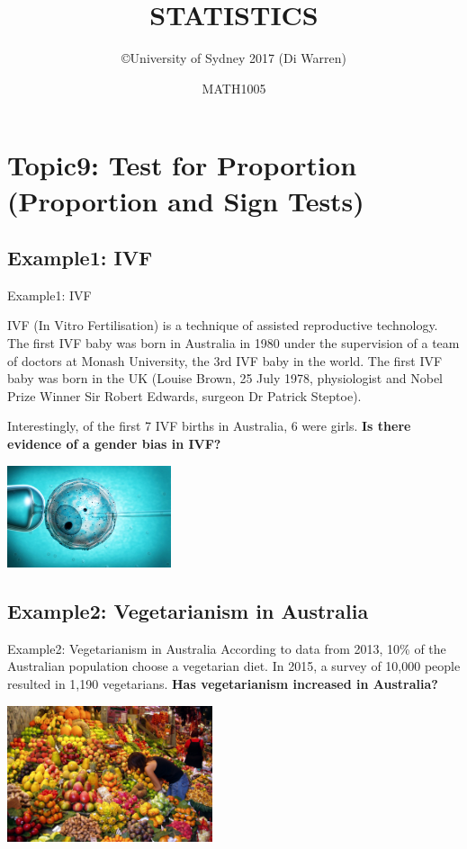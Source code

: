 \documentclass[t,xcolor=pdftex,dvipsnames,table]{beamer}
\title{\Huge STATISTICS}
\subtitle{}
\author{\copyright University of Sydney 2017 (Di Warren)}
\date{MATH1005}
\begin{document}
\section[9]{Topic9: Test for Proportion (Proportion and Sign Tests)}

\subsection[Example]{Example1: IVF}
\begin{frame}{Example1: IVF}

IVF (In Vitro Fertilisation) is a technique of assisted reproductive technology.
The first IVF baby was born in Australia in 1980 under the supervision of a team of doctors at Monash University, the 3rd IVF baby in the world. The first IVF baby was born in the UK (Louise Brown, 25 July 1978, physiologist and Nobel Prize Winner Sir Robert Edwards, surgeon Dr Patrick Steptoe).

\vspace{.5cm}
Interestingly, of the first 7 IVF births in Australia, 6 were girls. {\bf Is there evidence of a gender bias in IVF?}

\begin{center}
\includegraphics[height=3cm]{../images/IVF.jpg}
\end{center}
\end{frame}

\subsection[Example]{Example2: Vegetarianism in Australia}
\begin{frame}{Example2: Vegetarianism in Australia}
According to data from 2013, 10\% of the Australian population choose a vegetarian diet. In 2015, a survey of 10,000 people resulted in 1,190 vegetarians.
{\bf Has vegetarianism increased in Australia?}

\begin{center}
\includegraphics[height=4cm]{../images/BarcelonaFruit.jpg}
\end{center}
\href{http://www.roymorgan.com/findings/5264-meat-free-health-conscious-anxious-australias-vegetarians-201310272327}{}
\end{frame}
\end{document}
